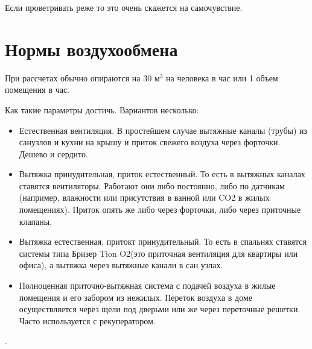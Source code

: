 Если проветривать реже то это очень скажется на самочувствие.  

\chapter{Нормы воздухообмена}

При рассчетах обычно опираются на 30 $\text{м}^3$ на человека в час или 1 объем помещения в час.

Как такие параметры достичь. Вариантов несколько:

\begin{itemize}
	\item Естественная вентиляция. В простейшем случае вытяжные каналы (трубы) из санузлов и кухни на крышу и приток свежего воздуха через форточки. Дешево и сердито.
	\item  Вытяжка принудительная, приток естественный. То есть в вытяжных каналах ставятся вентиляторы. Работают они либо постоянно, либо по датчикам (например, влажности или присутствия в ванной или CO2 в жилых помещениях). Приток опять же либо через форточки, либо через приточные клапаны.
	\item Вытяжка естественная, притокт принудительный.
	То есть в спальнях ставятся системы типа Бризер Tion O2(это приточная вентиляция для квартиры или офиса), а вытяжка через вытяжные канали в сан узлах.
	\item Полноценная приточно-вытяжная система с подачей воздуха в жилые помещения и его забором из нежилых. Переток воздуха в доме осуществляется через щели под дверьми или же через переточные решетки. Часто используется с рекуператором.
\end{itemize}. 


